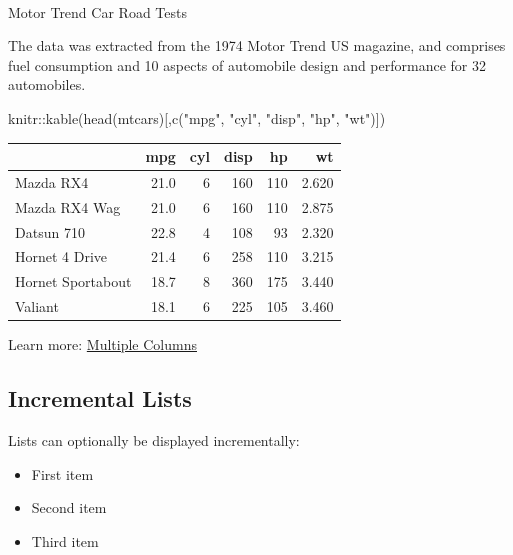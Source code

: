 \documentclass[
  letterpaper,
  DIV=11,
  numbers=noendperiod]{scrartcl}
\makeatletter
\let\oldparagraph\paragraph
\renewcommand{\paragraph}{
    \@ifstar
      \xxxParagraphStar
      \xxxParagraphNoStar
  }
\newcommand{\xxxParagraphStar}[1]{\oldparagraph*{#1}\mbox{}}
\newcommand{\xxxParagraphNoStar}[1]{\oldparagraph{#1}\mbox{}}
\newenvironment{Shaded}{\begin{snugshade}}{\end{snugshade}}
\newcommand{\FunctionTok}[1]{\textcolor[rgb]{0.28,0.35,0.67}{#1}}
\newcommand{\NormalTok}[1]{\textcolor[rgb]{0.00,0.23,0.31}{#1}}
\newcommand{\SpecialCharTok}[1]{\textcolor[rgb]{0.37,0.37,0.37}{#1}}
\newcommand{\StringTok}[1]{\textcolor[rgb]{0.13,0.47,0.30}{#1}}
\providecommand{\tightlist}{%
  \setlength{\itemsep}{0pt}\setlength{\parskip}{0pt}}
\makeatother
\begin{document}
\paragraph{Motor Trend Car Road Tests}\label{motor-trend-car-road-tests}

The data was extracted from the 1974 Motor Trend US magazine, and
comprises fuel consumption and 10 aspects of automobile design and
performance for 32 automobiles.

\begin{Shaded}
\begin{Highlighting}[]
\NormalTok{knitr}\SpecialCharTok{::}\FunctionTok{kable}\NormalTok{(}\FunctionTok{head}\NormalTok{(mtcars)[,}\FunctionTok{c}\NormalTok{(}\StringTok{"mpg"}\NormalTok{, }\StringTok{"cyl"}\NormalTok{, }\StringTok{"disp"}\NormalTok{, }\StringTok{"hp"}\NormalTok{, }\StringTok{"wt"}\NormalTok{)])}
\end{Highlighting}
\end{Shaded}

\begin{longtable}[]{@{}lrrrrr@{}}
\toprule\noalign{}
& mpg & cyl & disp & hp & wt \\
\midrule\noalign{}
\endhead
\bottomrule\noalign{}
\endlastfoot
Mazda RX4 & 21.0 & 6 & 160 & 110 & 2.620 \\
Mazda RX4 Wag & 21.0 & 6 & 160 & 110 & 2.875 \\
Datsun 710 & 22.8 & 4 & 108 & 93 & 2.320 \\
Hornet 4 Drive & 21.4 & 6 & 258 & 110 & 3.215 \\
Hornet Sportabout & 18.7 & 8 & 360 & 175 & 3.440 \\
Valiant & 18.1 & 6 & 225 & 105 & 3.460 \\
\end{longtable}

Learn more:
\href{https://?meta:prerelease-subdomainquarto.org/docs/presentations/revealjs/\#multiple-columns}{Multiple
Columns}

\subsection{Incremental Lists}\label{incremental-lists}

Lists can optionally be displayed incrementally:

\begin{itemize}
\tightlist
\item
  First item
\item
  Second item
\item
  Third item
\end{itemize}
\end{document}
